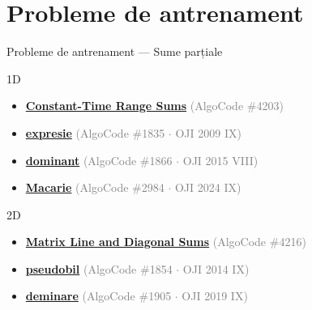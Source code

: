 ﻿\documentclass{beamer}
\begin{document}
\section{Probleme de antrenament}

\begin{frame}{Probleme de antrenament — Sume parțiale}
  \begin{block}{1D}
    \begin{itemize}\footnotesize\itemsep0pt
      \item \href{https://code.algolymp.com/problems/4203}{\textbf{Constant-Time Range Sums}} \textcolor{gray}{(AlgoCode \#4203)}
      \item \href{https://code.algolymp.com/problems/1835}{\textbf{expresie}} \textcolor{gray}{(AlgoCode \#1835 $\cdot$ OJI 2009 IX)}
      \item \href{https://code.algolymp.com/problems/1866}{\textbf{dominant}} \textcolor{gray}{(AlgoCode \#1866 $\cdot$ OJI 2015 VIII)}
      \item \href{https://code.algolymp.com/problems/2984}{\textbf{Macarie}} \textcolor{gray}{(AlgoCode \#2984 $\cdot$ OJI 2024 IX)}
    \end{itemize}
  \end{block}
  \vspace{-4pt}
  \begin{block}{2D}
    \begin{itemize}\footnotesize\itemsep0pt
      \item \href{https://code.algolymp.com/problems/4216}{\textbf{Matrix Line and Diagonal Sums}} \textcolor{gray}{(AlgoCode \#4216)}
      \item \href{https://code.algolymp.com/problems/1854}{\textbf{pseudobil}} \textcolor{gray}{(AlgoCode \#1854 $\cdot$ OJI 2014 IX)}
      \item \href{https://code.algolymp.com/problems/1905}{\textbf{deminare}} \textcolor{gray}{(AlgoCode \#1905 $\cdot$ OJI 2019 IX)}
    \end{itemize}
  \end{block}
\end{frame}
\end{document}
